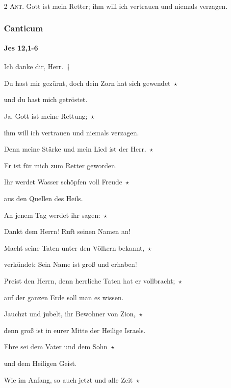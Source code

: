 \vspace{10pt}

\noindent \textsc{2 Ant.} Gott ist mein Retter; ihm will ich vertrauen und niemals verzagen. \nopagebreak

\subsubsection{Canticum}

\paragraph{Jes 12,1-6}

\noindent Ich danke dir, Herr.~†~\nopagebreak

Du hast mir gezürnt, doch dein Zorn hat sich gewendet~$\star$~\nopagebreak

und du hast mich getröstet.

\noindent Ja, Gott ist meine Rettung;~$\star$~\nopagebreak

ihm will ich vertrauen und niemals verzagen.

\noindent Denn meine Stärke und mein Lied ist der Herr.~$\star$~\nopagebreak

Er ist für mich zum Retter geworden.

\noindent Ihr werdet Wasser schöpfen voll Freude~$\star$~\nopagebreak

aus den Quellen des Heils.

\noindent An jenem Tag werdet ihr sagen:~$\star$~\nopagebreak

Dankt dem Herrn! Ruft seinen Namen an!

\noindent Macht seine Taten unter den Völkern bekannt,~$\star$~\nopagebreak

verkündet: Sein Name ist groß und erhaben!

\noindent Preist den Herrn, denn herrliche Taten hat er vollbracht;~$\star$~\nopagebreak

auf der ganzen Erde soll man es wissen.

\noindent Jauchzt und jubelt, ihr Bewohner von Zion,~$\star$~\nopagebreak

denn groß ist in eurer Mitte der Heilige Israels.

\noindent Ehre sei dem Vater und dem Sohn~$\star$~\nopagebreak

und dem Heiligen Geist.

\noindent Wie im Anfang, so auch jetzt und alle Zeit~$\star$~\nopagebreak

